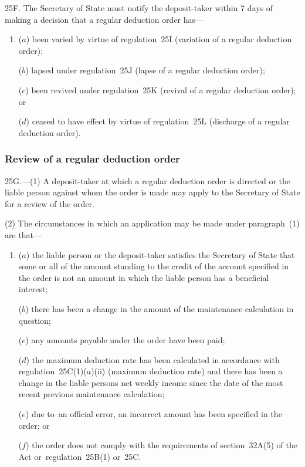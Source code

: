 \documentclass[12pt,a4paper]{article}
\begin{document}
25F.  The 
Secretary of State  %
must notify the deposit-taker within 7 days of making a decision that a regular deduction order has—
\begin{enumerate}\item[]
($a$) been varied by virtue of regulation~25I (variation of a regular deduction order);

($b$) lapsed under regulation~25J (lapse of a regular deduction order);

($c$) been revived under regulation~25K (revival of a regular deduction order); or

($d$) ceased to have effect by virtue of regulation~25L (discharge of a regular deduction order).
\end{enumerate}


\subsubsection[25G. Review of a regular deduction order]{Review of a regular deduction order}

25G.---(1)  A deposit-taker at which a regular deduction order is directed or the liable person against whom the order is made may apply to the 
Secretary of State  %
for a review of the order.

(2) The circumstances in which an application may be made under paragraph~(1) are that—
\begin{enumerate}\item[]
($a$) the liable person or the deposit-taker satisfies the 
Secretary of State  %
that some or all of the amount standing to the credit of the account specified in the order is not an amount in which the liable person has a beneficial interest;

($b$) there has been a change in the amount of the maintenance calculation in question;

($c$) any amounts payable under the order have been paid;

($d$) the maximum deduction rate has been calculated in accordance with regulation~25C(1)($a$)(ii)  (maximum deduction rate) and there has been a change in the liable persons net weekly income since the date of the most recent previous maintenance calculation;

($e$) due to~an official error, an incorrect amount has been specified in the order; or

($f$) the order does not comply with the requirements of section~32A(5) of the Act or~regulation~25B(1) or~25C.
\end{enumerate}
\end{document}

